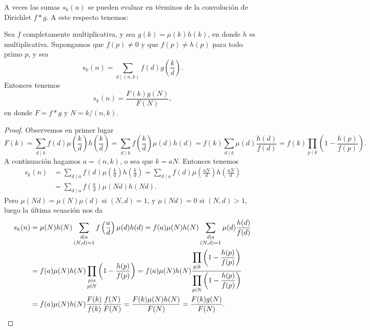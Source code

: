 \documentclass[12pt,a4paper]{book}
\begin{document}
    A veces las sumas $s_{k}(n)$ se pueden evaluar en términos de la convolución de Dirichlet
    $f*g$. A este respecto tenemos:

    \begin{teorema}
        Sea $f$ completamente multiplicativa, y sea $g(k)=\mu(k)h(k)$, en donde $h$ es
        multiplicativa. Supongamos que $f(p)\neq0$ y que $f(p)\neq h(p)$ para todo primo
        $p$, y sea
        \begin{equation*}
            s_{k}(n)=\sum_{d\mid(n,k)}f(d)g\left(\frac{k}{d}\right).
        \end{equation*}
        Entonces tenemos
        \begin{equation*}
            s_{k}(n)=\frac{F(k)g(N)}{F(N)},
        \end{equation*}
        en donde $F=f*g$ y $N=k/(n,k)$.
    \end{teorema}

    \begin{proof}
        Observemos en primer lugar
        \begin{equation*}
            F(k)=\sum_{d\mid k}f(d)\mu\left(\frac{k}{d}\right)h\left(\frac{k}{d}\right)
            =\sum_{d\mid k}f\left(\frac{k}{d}\right)\mu(d)h(d)=f(k)\sum_{d\mid k}\mu(d)\frac{h(d)}{f(d)}
            =f(k)\prod_{p\mid k}\left(1-\frac{h(p)}{f(p)}\right).
        \end{equation*}
        A continuación hagamos $a=(n,k)$, o sea que $k=aN$. Entonces tenemos
        \begin{align*}
            s_{k}(n)&=\sum_{d\mid a}f(d)\mu\left(\frac{k}{d}\right)h\left(\frac{k}{d}\right)
            =\sum_{d\mid a}f(d)\mu\left(\frac{aN}{d}\right)h\left(\frac{aN}{d}\right)\\
            &=\sum_{d\mid a}f\left(\frac{a}{d}\right)\mu(Nd)h(Nd).
        \end{align*}
        Pero $\mu(Nd)=\mu(N)\mu(d)$ si $(N,d)=1$, y $\mu(Nd)=0$ si $(N,d)>1$, luego la
        última ecuación nos da
        \begin{align*}
            s_{k}(n)&=\mu(N)h(N)\sum_{\substack{d\mid a\\(N,d)=1}}f\left(\frac{a}{d}\right)\mu(d)h(d)
            =f(a)\mu(N)h(N)\sum_{\substack{d\mid a\\(N,d)=1}}\mu(d)\frac{h(d)}{f(d)}\\
            &=f(a)\mu(N)h(N)\prod_{\substack{p\mid a\\p\nmid N}}\left(1-\frac{h(p)}{f(p)}\right)
            =f(a)\mu(N)h(N)\frac{\displaystyle\prod_{p\mid k}\left(1-\frac{h(p)}{f(p)}\right)}
            {\displaystyle\prod_{p\mid N}\left(1-\frac{h(p)}{f(p)}\right)}\\
            &=f(a)\mu(N)h(N)\frac{F(k)}{f(k)}\frac{f(N)}{F(N)}=\frac{F(k)\mu(N)h(N)}{F(N)}=\frac{F(k)g(N)}{F(N)}.\qedhere
        \end{align*}
    \end{proof}
\end{document}
